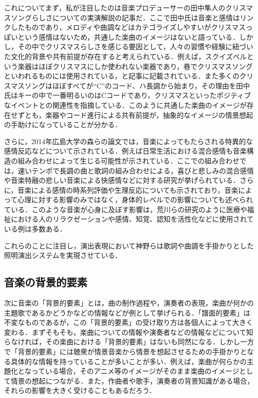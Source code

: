 \documentclass[submit,techrep,noauthor]{ipsj}
\begin{document}
これについてまず，私が注目したのは音楽プロデューサーの田中隼人のクリスマスソングらしさについての実演解説の記事だ\cite{xmassong}．ここで田中氏は音楽と感情はリンクしたものであり，メロディや曲調などはカテゴライズしやすいがクリスマスっぽいという感情はないため，共通した楽曲のイメージはないと語っている．しかし，その中でクリスマスらしさを感じる要因として，人々の習慣や経験に紐づいた文化的背景や共有前提が存在すると考えられている．例えば，スクイズベルという楽器はほぼクリスマスにしか使われない楽器であり，巷でクリスマスソングといわれるものには使用されている，と記事に記載されている．また多くのクリスマスソングはほぼすべてが“C”のコード、ハ長調から始まり，その理由を田中氏はキーの中で一番明るいのはCコードであり，クリスマスといったポジティブなイベントとの関連性を指摘している．このように共通した楽曲のイメージが存在せずとも，楽器やコード進行による共有前提が，抽象的なイメージの情景想起の手助けになっていることが分かる．

さらに，2014年広島大学の森らの論文では，音楽によってもたらされる特異的な感情反応などについて示されている\cite{Mori14}．例えば日常生活における混合感情も音楽構造の組み合わせによって生じる可能性が示されている．ここでの組み合わせでは，速いテンポで長調の曲と歌詞の組み合わせによる，喜びと悲しみの混合感情や音楽特融の悲しい音楽による快感情などに対する研究が挙げられている．さらに，音楽による感情の時系列評価や生理反応についても示されており，音楽によって心理に対する影響のみではなく，身体的レベルでの影響についても述べられている．このような音楽が心身に及ぼす影響は，荒川らの研究のように医療や福祉における人のリラクゼーションや感情、知覚、認知を活性化などに使用されている例は多数ある\cite{Arakawa96}．

これらのことに注目し，演出表現において神野らは歌詞や曲調を手掛かりとした照明演出システムを実現させている\cite{Kanno22}．
\subsection{音楽の背景的要素}
次に音楽の「背景的要素」とは，曲の制作過程や，演奏者の表現，楽曲が何かの主題歌であるかどうかなどの情報などが例として挙げられる．「譜面的要素」は不変なものであるが，この「背景的要素」の受け取り方は各個人によって大きく変わる．まずそもそも，楽曲についての情報や演奏者などの情報などについて知らなければ，その楽曲における「背景的要素」はないも同然になる．しかし一方で「背景的要素」には聴衆が情景音楽から情景を想起させるための手掛かりとなる具体的な情報を持っていることが多いことが多い．例えば，楽曲が何らかの主題化となっている場合，そのアニメ等のイメージがそのまま楽曲のイメージとして情景の想起につながる．また，作曲者や歌手，演奏者の背景知識がある場合，それらの影響を大きく受けることもあるだろう．
\end{document}
